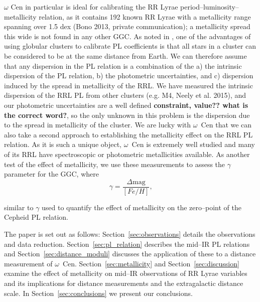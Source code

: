 \documentclass[a4paper,fleqn,usenatbib]{mnras}
\begin{document}
$\omega$ Cen in particular is ideal for calibrating the RR Lyrae period--luminosity--metallicity relation, as it contains 192 known RR Lyrae \citep{2004A&A...424.1101K} with a metallicity range spanning over 1.5 dex (Bono 2013, private communication); a metallicity spread this wide is not found in any other GGC. As noted in \citet{2006MNRAS.372.1675S}, one of the advantages of using globular clusters to calibrate PL coefficients is that all stars in a cluster can be considered to be at the same distance from Earth. We can therefore assume that any dispersion in the PL relation is a combination of the a) the intrinsic dispersion of the PL relation, b) the photometric uncertainties, and c) dispersion induced by the spread in metallicity of the RRL. We have measured the intrinsic dispersion of the RRL PL from other clusters (e.g. M4, Neely et al. 2015), and our photometric uncertainties are a well defined \textbf{constraint, value?? what is the correct word?}, so the only unknown in this problem is the dispersion due to the spread in metallicity of the cluster. We are lucky with $\omega$~Cen that we can also take a second approach to establishing the metallicity effect on the RRL PL relation. As it is such a unique object, $\omega$~Cen is extremely well studied and many of its RRL have spectroscopic or photometric metallicities available. As another test of the effect of metallicity, we use these measurements to assess the $\gamma$ parameter for the GGC, where 
\begin{equation} \label{eqn:gamma}
\gamma = \dfrac {\Delta \text{mag}} {[Fe/H]}\text{,}
\end{equation}

similar to $\gamma$ used to quantify the effect of metallicity on the zero--point of the Cepheid PL relation. 

The paper is set out as follows: Section~\ref{sec:observations} details the observations and data reduction. Section~\ref{sec:pl_relation} describes the mid--IR PL relations and Section~\ref{sec:distance_moduli} discusses the application of these to a distance measurement of  $\omega$~Cen. Section~\ref{sec:metallicity} and Section~\ref{sec:discussion} examine the effect of metallicity on mid--IR observations of RR Lyrae variables and its implications for distance measurements and the extragalactic distance scale. In Section~\ref{sec:conclusions} we present our conclusions.
\end{document}
